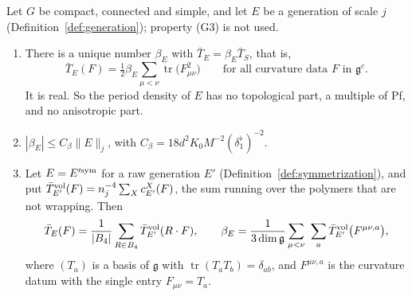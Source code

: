 \begin{proposition}\label{prop:period-iso}
Let $G$ be compact, connected and simple, and let $E$ be a generation of scale $j$ (Definition~\ref{def:generation}); property (G3) is not used.
\begin{enumerate}[label=(\alph*)]
\item There is a unique number $\beta_E$ with $\bar T_E=\beta_E\bar T_S$, that is,
\[
\bar T_E(F)=\tfrac12\beta_E\sum_{\mu<\nu}\operatorname{tr}\big(F_{\mu\nu}^2\big)\qquad\text{for all curvature data }F\text{ in }\mathfrak g^c .
\]
It is real. So the period density of $E$ has no topological part, a multiple of Pf, and no anisotropic part.
\item $|\beta_E|\le C_\beta\|E\|_j$, with $C_\beta=18d^2K_0M^{-2}(\delta_1^\flat)^{-2}$.
\item Let $E=E'^{\rm sym}$ for a raw generation $E'$ (Definition~\ref{def:symmetrization}), and put $\bar T^{\rm vol}_{E'}(F)=n_j^{-4}\sum_Xc^X_{E'}(F)$, the sum running over the polymers that are not wrapping. Then
\[
\bar T_E(F)=\frac1{|B_4|}\sum_{R\in B_4}\bar T^{\rm vol}_{E'}(R\cdot F),\qquad\beta_E=\frac1{3\dim\mathfrak g}\sum_{\mu<\nu}\ \sum_a\bar T^{\rm vol}_{E'}\big(F^{\mu\nu,a}\big),
\]
where $(T_a)$ is a basis of $\mathfrak g$ with $\operatorname{tr}(T_aT_b)=\delta_{ab}$, and $F^{\mu\nu,a}$ is the curvature datum with the single entry $F_{\mu\nu}=T_a$.
\end{enumerate}
\end{proposition}

